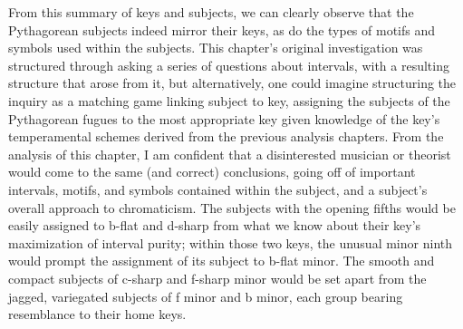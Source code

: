 From this summary of keys and subjects, we can clearly observe that the
Pythagorean subjects indeed mirror their keys, as do the types of motifs
and symbols used within the subjects. This chapter's original
investigation was structured through asking a series of questions about
intervals, with a resulting structure that arose from it, but
alternatively, one could imagine structuring the inquiry as a matching
game linking subject to key, assigning the subjects of the Pythagorean
fugues to the most appropriate key given knowledge of the key's
temperamental schemes derived from the previous analysis chapters. From
the analysis of this chapter, I am confident that a disinterested
musician or theorist would come to the same (and correct) conclusions,
going off of important intervals, motifs, and symbols contained within
the subject, and a subject's overall approach to chromaticism. The
subjects with the opening fifths would be easily assigned to b-flat and
d-sharp from what we know about their key's maximization of interval
purity; within those two keys, the unusual minor ninth would prompt the
assignment of its subject to b-flat minor. The smooth and compact
subjects of c-sharp and f-sharp minor would be set apart from the
jagged, variegated subjects of f minor and b minor, each group bearing
resemblance to their home keys.

